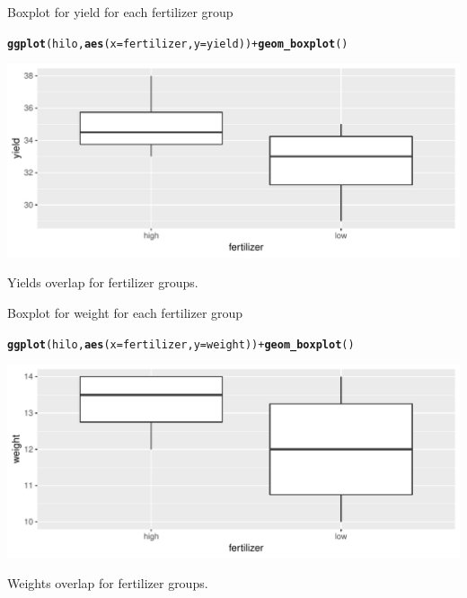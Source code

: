\documentclass[unknownkeysallowed]{beamer}\usepackage[]{graphicx}\usepackage[]{color}
\makeatletter
\def\maxwidth{ %
  \ifdim\Gin@nat@width>\linewidth
    \linewidth
  \else
    \Gin@nat@width
  \fi
}
\newcommand{\hlopt}[1]{\textcolor[rgb]{0,0,0}{#1}}%
\newcommand{\hlstd}[1]{\textcolor[rgb]{0.345,0.345,0.345}{#1}}%
\newcommand{\hlkwc}[1]{\textcolor[rgb]{0.333,0.667,0.333}{#1}}%
\newcommand{\hlkwd}[1]{\textcolor[rgb]{0.737,0.353,0.396}{\textbf{#1}}}%
\newenvironment{kframe}{%
 \def\at@end@of@kframe{}%
 \ifinner\ifhmode%
  \def\at@end@of@kframe{\end{minipage}}%
  \begin{minipage}{\columnwidth}%
 \fi\fi%
 \def\FrameCommand##1{\hskip\@totalleftmargin \hskip-\fboxsep
 \colorbox{shadecolor}{##1}\hskip-\fboxsep
     \hskip-\linewidth \hskip-\@totalleftmargin \hskip\columnwidth}%
 \MakeFramed {\advance\hsize-\width
   \@totalleftmargin\z@ \linewidth\hsize
   \@setminipage}}%
 {\par\unskip\endMakeFramed%
 \at@end@of@kframe}
\newenvironment{knitrout}{}{} %
\makeatother
\begin{document}
\begin{frame}[fragile]{Boxplot for yield for each fertilizer group}

 
\begin{knitrout}\small
{}\color{fgcolor}\begin{kframe}
\begin{alltt}
\hlkwd{ggplot}\hlstd{(hilo,}\hlkwd{aes}\hlstd{(}\hlkwc{x}\hlstd{=fertilizer,}\hlkwc{y}\hlstd{=yield))}\hlopt{+}\hlkwd{geom_boxplot}\hlstd{()}
\end{alltt}
\end{kframe}
\includegraphics[width=\maxwidth]{figure/ferto-1} 

\end{knitrout}
  
Yields overlap for fertilizer groups.
  
\end{frame}

\begin{frame}[fragile]{Boxplot for weight for each fertilizer group}

 
\begin{knitrout}\small
{}\color{fgcolor}\begin{kframe}
\begin{alltt}
\hlkwd{ggplot}\hlstd{(hilo,}\hlkwd{aes}\hlstd{(}\hlkwc{x}\hlstd{=fertilizer,}\hlkwc{y}\hlstd{=weight))}\hlopt{+}\hlkwd{geom_boxplot}\hlstd{()}
\end{alltt}
\end{kframe}
\includegraphics[width=\maxwidth]{figure/casteldisangro-1} 

\end{knitrout}

Weights overlap for fertilizer groups.
  
\end{frame}
\end{document}

